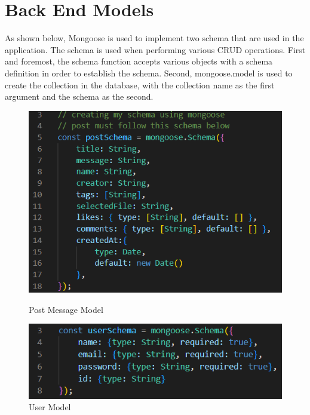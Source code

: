 \section{Back End Models}
As shown below, Mongoose is used to implement two schema that are used in the application. The schema is used when performing various CRUD operations. First and foremost, the schema function accepts various objects with a schema definition in order to establish the schema. Second, mongoose.model is used to create the collection in the database, with the collection name as the first argument and the schema as the second.
\begin{figure}[ht]
\begin{minipage}[b]{0.4\linewidth}
    \centering
    \includegraphics[width=\linewidth]{images/postMessageModel}
    \caption{Post Message Model}
\end{minipage}
    \hspace{0.5cm}
    \begin{minipage}[b]{0.5\linewidth}
    \centering
   \includegraphics[width=\linewidth]{images/userModel}
    \caption{User Model}
\end{minipage}
\end{figure}

